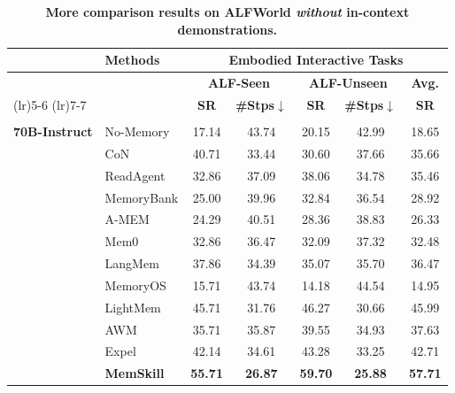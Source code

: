 

\begin{table}[h]
    \footnotesize
    \centering
    \setlength{\tabcolsep}{5.5pt}
    \caption{\textbf{More comparison results on ALFWorld \textit{without} in-context demonstrations.}}
    \label{tab:more_exp_alfworld}

    \begin{tabular}{>{\centering\arraybackslash}m{0.5cm} l cc cc c}
        \toprule
        \multirow{3}{*}{\textbf{Model}} &
        \multirow{3}{*}{\textbf{Methods}} &
        \multicolumn{5}{c}{\textbf{Embodied Interactive Tasks}} \\
        \cmidrule(lr){3-7}
        & &
        \multicolumn{2}{c}{\textbf{ALF-Seen}} &
        \multicolumn{2}{c}{\textbf{ALF-Unseen}} &
        \multicolumn{1}{c}{\textbf{Avg.}} \\
        \cmidrule(lr){3-4} \cmidrule(lr){5-6} \cmidrule(lr){7-7}
        & &
        \textbf{SR} & \textbf{\#Stps$\downarrow$} &
        \textbf{SR} & \textbf{\#Stps$\downarrow$} &
        \textbf{SR} \\
        \midrule

        \multirow{12}{*}{\rotatebox[origin=c]{90}{\shortstack{\textbf{LLaMA3.3}\\\textbf{70B-Instruct}}}} &
        No-Memory   & 17.14 & 43.74 & 20.15 & 42.99 & 18.65 \\
        & CoN   & 40.71 & 33.44 & 30.60 & 37.66 & 35.66 \\
        & ReadAgent   & 32.86 & 37.09 & 38.06 & 34.78 & 35.46 \\
        & MemoryBank   & 25.00 & 39.96 & 32.84 & 36.54 & 28.92 \\
        & A-MEM   & 24.29 & 40.51 & 28.36 & 38.83 & 26.33 \\
        & Mem0   & 32.86 & 36.47 & 32.09 & 37.32 & 32.48 \\
        & LangMem   & 37.86 & 34.39 & 35.07 & 35.70 & 36.47 \\
        & MemoryOS   & 15.71 & 43.74 & 14.18 & 44.54 & 14.95 \\
        & LightMem   & 45.71 & 31.76 & 46.27 & 30.66 & 45.99 \\
        & AWM   & 35.71 & 35.87 & 39.55 & 34.93 & 37.63 \\
        & Expel   & 42.14 & 34.61 & 43.28 & 33.25 & 42.71 \\
        & \cellcolor{hl-llama}\textbf{MemSkill} &
        \cellcolor{hl-llama}\textbf{55.71} & \cellcolor{hl-llama}\textbf{26.87} &
        \cellcolor{hl-llama}\textbf{59.70} & \cellcolor{hl-llama}\textbf{25.88} &
        \cellcolor{hl-llama}\textbf{57.71} \\
        \midrule


\end{tabular}
\end{table}
